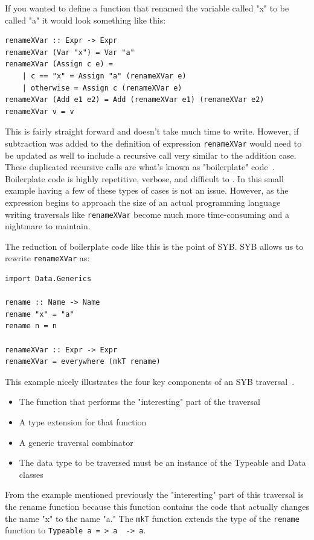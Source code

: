 	If you wanted to define a function that renamed the variable called "x" to be called "a" it would look something like this:
	
	\begin{verbatim}
renameXVar :: Expr -> Expr
renameXVar (Var "x") = Var "a"
renameXVar (Assign c e) = 
	| c == "x" = Assign "a" (renameXVar e)
	| otherwise = Assign c (renameXVar e)
renameXVar (Add e1 e2) = Add (renameXVar e1) (renameXVar e2)
renameXVar v = v
	\end{verbatim}
	
	This is fairly straight forward and doesn't take much time to write. However, if subtraction was added to the definition of expression \texttt{renameXVar} would need to be updated as well to include a recursive call very similar to the addition case. These duplicated recursive calls are what's known as "boilerplate" code~\citep{syb}. Boilerplate code is highly repetitive, verbose, and difficult to .  In this small example having a few of these types of cases is not an issue. However, as the expression begins to approach the size of an actual programming language writing traversals like \texttt{renameXVar} become much more time-consuming and a nightmare to maintain. 
	
	The reduction of boilerplate code like this is the point of SYB. SYB allows us to rewrite \texttt{renameXVar} as:
	
	\begin{verbatim}
import Data.Generics	
	
rename :: Name -> Name
rename "x" = "a"
rename n = n

renameXVar :: Expr -> Expr
renameXVar = everywhere (mkT rename)
	\end{verbatim} 
	
	This example nicely illustrates the four key components of an SYB traversal~\citep{syb}.

	\begin{itemize}
		\item The function that performs the "interesting" part of the traversal
		\item A type extension for that function
		\item A generic traversal combinator
		\item The data type to be traversed must be an instance of the Typeable and Data classes
	\end{itemize}
	
	From the example mentioned previously the "interesting" part of this traversal is the rename function because this function contains the code that actually changes the name "x" to the name "a." The \texttt{mkT} function extends the type of the \texttt{rename} function to \texttt{Typeable~a = > a~ -> a}. 
	
